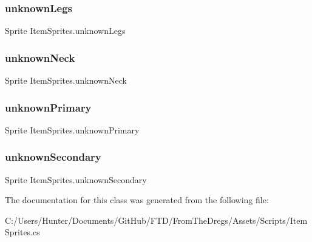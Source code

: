 \mbox{\label{class_item_sprites_a67fccfa226dd5c1e6295ec6783be0688}} 
\subsubsection{\texorpdfstring{unknownLegs}{unknownLegs}}
{\footnotesize\ttfamily Sprite Item\+Sprites.\+unknown\+Legs}

\mbox{\label{class_item_sprites_ae998a241707a0954c0897fb15064bf7a}} 
\subsubsection{\texorpdfstring{unknownNeck}{unknownNeck}}
{\footnotesize\ttfamily Sprite Item\+Sprites.\+unknown\+Neck}

\mbox{\label{class_item_sprites_a492900f0ec1e48269f947ad33c2edd8c}} 
\subsubsection{\texorpdfstring{unknownPrimary}{unknownPrimary}}
{\footnotesize\ttfamily Sprite Item\+Sprites.\+unknown\+Primary}

\mbox{\label{class_item_sprites_a5ef9da17a7a9a1cdb3512af435693f15}} 
\subsubsection{\texorpdfstring{unknownSecondary}{unknownSecondary}}
{\footnotesize\ttfamily Sprite Item\+Sprites.\+unknown\+Secondary}



The documentation for this class was generated from the following file\+:\begin{DoxyCompactItemize}
\item 
C\+:/\+Users/\+Hunter/\+Documents/\+Git\+Hub/\+F\+T\+D/\+From\+The\+Dregs/\+Assets/\+Scripts/Item\+Sprites.\+cs\end{DoxyCompactItemize}
